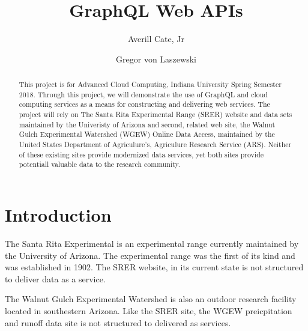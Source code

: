 
\title{GraphQL Web APIs}

\author{Averill Cate, Jr}

\author{Gregor von Laszewski}

\renewcommand{\shortauthors}{G. v. Laszewski}

\begin{abstract}
This project is for Advanced Cloud Computing, Indiana University Spring 
Semester 2018.  Through this project, we will demonstrate the use of 
GraphQL\cite{hid505FacebookGraphQL2018} and cloud computing services as a 
means for constructing and delivering web services.  The project will rely on 
The Santa Rita  Experimental Range (SRER) website and data sets maintained by 
the Univeristy of Arizona and second, related web site, the Walnut Gulch 
Experimental Watershed (WGEW) Online Data Access, maintained by the United 
States Department of Agriculure's, Agriculure Research Service (ARS).  
Neither of these existing sites provide modernized data services, yet both 
sites provide potentiall valuable data to the research community.

\end{abstract}


\maketitle

\section{Introduction}
The Santa Rita Experimental is an experimental range currently maintained by 
the University of Arizona.  The experimental range was the first of its kind 
and was established in 1902\cite{SrerWebSite2018}.  The SRER website, in its 
current state is not structured to deliver data as a service.

The Walnut Gulch Experimental Watershed is also an outdoor research facility 
located in southestern Arizona\cite{WgewWebSite2018}.  Like the SRER site, 
the WGEW preicpitation and runoff data site is not structured to delivered as 
services.

